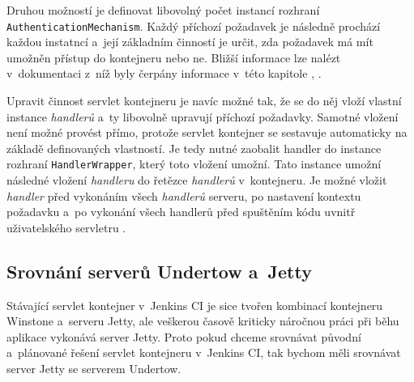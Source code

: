                 Druhou možností je definovat
                libovolný počet instancí rozhraní \texttt{AuthenticationMechanism}. Každý příchozí požadavek
                je následně prochází každou instatncí a~její základním činností je určit, zda požadavek má
                mít umožněn přístup do kontejneru nebo ne. Bližší informace lze nalézt v~dokumentaci z~níž
                byly čerpány informace v~této kapitole \cite{undertowDeployment}, \cite{undertowSecurity}.

                \medskip
                Upravit činnost servlet kontejneru je navíc možné tak, že se do něj vloží vlastní instance
                \emph{handlerů} a~ty libovolně upravují příchozí požadavky. Samotné vložení
                není možné provést přímo, protože servlet kontejner se sestavuje automaticky na základě
                definovaných vlastností. Je tedy nutné zaobalit handler do instance rozhraní \texttt{HandlerWrapper},
                který toto vložení umožní. Tato instance umožní následné vložení \emph{handleru} do řetězce \emph{handlerů}
                v~kontejneru. Je možné vložit \emph{handler} před vykonáním všech \emph{handlerů} serveru, po
                nastavení kontextu požadavku a~po vykonání všech handlerů před spuštěním kódu uvnitř uživatelského 
                servletru \cite{undertowDeployment}.
 
        
        \subsection{Srovnání serverů Undertow a~Jetty}\label{srovnani}
            Stávající servlet kontejner v~Jenkins CI je sice tvořen
            kombinací kontejneru Winstone a~serveru Jetty, ale veškerou
            časově kriticky náročnou práci při běhu aplikace vykonává server
            Jetty. Proto pokud chceme srovnávat původní a~plánované řešení servlet kontejneru
            v~Jenkins CI, tak bychom měli srovnávat server Jetty se serverem Undertow.

